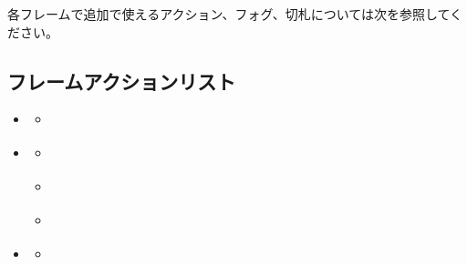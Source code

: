 \documentclass[letterpaper,10pt,dvipdfmx]{sphinxmanual}
\begin{document}
\sphinxAtStartPar
各フレームで追加で使えるアクション、フォグ、切札については次を参照してください。

\sphinxstepscope


\subsection{フレームアクションリスト}
\label{\detokenize{auto/frameActionlist:actionlist-act-frame}}\label{\detokenize{auto/frameActionlist:act-act-frame}}\label{\detokenize{auto/frameActionlist:id1}}\label{\detokenize{auto/frameActionlist::doc}}
\begin{sphinxShadowBox}
\begin{itemize}
\item {} 
\sphinxAtStartPar
{}\label{\detokenize{auto/frameActionlist:id171}}{\hyperref[\detokenize{auto/frameActionlist:id3}]{}}
\begin{itemize}
\item {} 
\sphinxAtStartPar
{}\label{\detokenize{auto/frameActionlist:id172}}{\hyperref[\detokenize{auto/frameActionlist:act-packopen}]{}}

\end{itemize}

\item {} 
\sphinxAtStartPar
{}\label{\detokenize{auto/frameActionlist:id173}}{\hyperref[\detokenize{auto/frameActionlist:id5}]{}}
\begin{itemize}
\item {} 
\sphinxAtStartPar
{}\label{\detokenize{auto/frameActionlist:id174}}{\hyperref[\detokenize{auto/frameActionlist:act-raredraw}]{}}

\item {} 
\sphinxAtStartPar
{}\label{\detokenize{auto/frameActionlist:id175}}{\hyperref[\detokenize{auto/frameActionlist:act-summonsrare}]{}}

\item {} 
\sphinxAtStartPar
{}\label{\detokenize{auto/frameActionlist:id176}}{\hyperref[\detokenize{auto/frameActionlist:act-trapcounter}]{}}

\end{itemize}

\item {} 
\sphinxAtStartPar
{}\label{\detokenize{auto/frameActionlist:id177}}{\hyperref[\detokenize{auto/frameActionlist:id9}]{}}
\begin{itemize}
\item {} 
\sphinxAtStartPar
{}\label{\detokenize{auto/frameActionlist:id178}}{\hyperref[\detokenize{auto/frameActionlist:act-quickopen}]{}}


\end{itemize}
\end{itemize}
\end{sphinxShadowBox}
\end{document}
